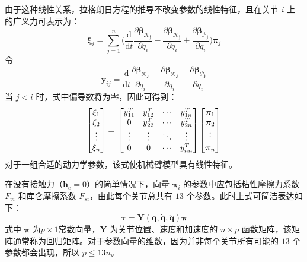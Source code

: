 \documentclass[cn,11pt,chinese,blue,bibstyle=ieeetr]{elegantbook}
\begin{document}
由于这种线性关系，拉格朗日方程的推导不改变参数的线性特征，且在关节 $i$ 上的广义力可表示为：
\begin{equation}\label{augmented_link_lagrange_equation}
\bm{\xi}_i = \sum_{j=1}^{n} \Big(\frac{\mathrm{d}}{\mathrm{d}t} \frac{\partial \bm{\beta_{\mathcal{K}_j}}}{\partial \dot{q}_i} - \frac{\partial \bm{\beta_{\mathcal{K}_j}}}{\partial q_i} + \frac{\partial \bm{\beta_{\mathcal{P}_j}}}{\partial q_i}
\Big) \bm{\pi}_j
\end{equation}
令
\begin{equation}
\bm{y}_{ij} = \frac{\mathrm{d}}{\mathrm{d}t} \frac{\partial \bm{\beta_{\mathcal{K}_j}}}{\partial \dot{q}_i} - \frac{\partial \bm{\beta_{\mathcal{K}_j}}}{\partial q_i} + \frac{\partial \bm{\beta_{\mathcal{P}_j}}}{\partial q_i} \nonumber
\end{equation}
当 $j < i$ 时，式中偏导数将为零，因此可得到：
\begin{equation}
\begin{bmatrix}
\xi_1  \\
\xi_2  \\
\vdots \\
\xi_n
\end{bmatrix} = \\
\begin{bmatrix}
y_{11}^T & y_{12}^T & \cdots & y_{1n}^T \\
0        & y_{22}^T & \cdots & y_{2n}^T \\
\vdots   & \vdots   & \ddots & \vdots \\
0        & 0        & \cdots & y_{nn}^T \\
\end{bmatrix}
\begin{bmatrix}
\bm{\pi}_1 \\
\bm{\pi}_2 \\
\vdots \\
\bm{\pi}_n
\end{bmatrix} \nonumber
\end{equation}
对于一组合适的动力学参数，该式使机械臂模型具有线性特征。

在没有接触力（$\bm{h}_e = 0$）的简单情况下，向量 $\bm{\pi}_i$ 的参数中应包括粘性摩擦力系数 $F_{vi}$ 和库仑摩擦系数 $F_{si}$，由此每个关节总共有 $13$ 个参数。此时上式可简洁表达如下：
\begin{equation}
\bm{\tau = Y\left(q,\dot{q},\ddot{q}\right)\pi}
\end{equation}
式中 $\bm{\pi}$ 为$p \times 1$常数向量，$\bm{Y}$ 为关节位置、速度和加速度的 $n \times p$ 函数矩阵，该矩阵通常称为回归矩阵。对于参数向量的维数，因为并非每个关节所有可能的 $13$ 个参数都会出现，所以 $p \leq 13n$。
\end{document}

